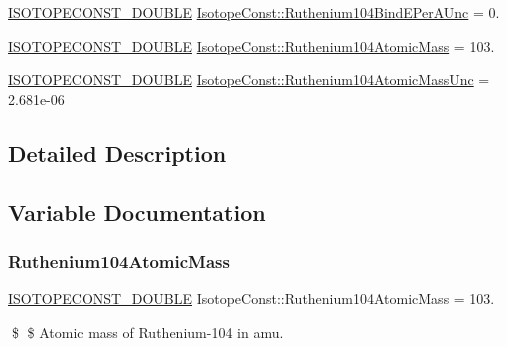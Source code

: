 \begin{DoxyCompactItemize}
\mbox{\hyperlink{group___isotope_const-_macros_ga8f45a7272ce02c0b4c65c44636ed719a}{I\+S\+O\+T\+O\+P\+E\+C\+O\+N\+S\+T\+\_\+\+D\+O\+U\+B\+LE}} \mbox{\hyperlink{group___isotope_const-_ruthenium-_ru104_ga43954b109e69058d0c82a1513cb40e38}{Isotope\+Const\+::\+Ruthenium104\+Bind\+E\+Per\+A\+Unc}} = 0.
\item 
\mbox{\hyperlink{group___isotope_const-_macros_ga8f45a7272ce02c0b4c65c44636ed719a}{I\+S\+O\+T\+O\+P\+E\+C\+O\+N\+S\+T\+\_\+\+D\+O\+U\+B\+LE}} \mbox{\hyperlink{group___isotope_const-_ruthenium-_ru104_ga0a195760467192883ad00c6e3ee94f8d}{Isotope\+Const\+::\+Ruthenium104\+Atomic\+Mass}} = 103.
\item 
\mbox{\hyperlink{group___isotope_const-_macros_ga8f45a7272ce02c0b4c65c44636ed719a}{I\+S\+O\+T\+O\+P\+E\+C\+O\+N\+S\+T\+\_\+\+D\+O\+U\+B\+LE}} \mbox{\hyperlink{group___isotope_const-_ruthenium-_ru104_ga26c836e5eb6c9ea11894e73d64dc2125}{Isotope\+Const\+::\+Ruthenium104\+Atomic\+Mass\+Unc}} = 2.\+681e-\/06
\end{DoxyCompactItemize}


\subsection{Detailed Description}


\subsection{Variable Documentation}
\mbox{\label{group___isotope_const-_ruthenium-_ru104_ga0a195760467192883ad00c6e3ee94f8d}} 
\subsubsection{\texorpdfstring{Ruthenium104\+Atomic\+Mass}{Ruthenium104AtomicMass}}
{\footnotesize\ttfamily \mbox{\hyperlink{group___isotope_const-_macros_ga8f45a7272ce02c0b4c65c44636ed719a}{I\+S\+O\+T\+O\+P\+E\+C\+O\+N\+S\+T\+\_\+\+D\+O\+U\+B\+LE}} Isotope\+Const\+::\+Ruthenium104\+Atomic\+Mass = 103.}

\$ \$ Atomic mass of Ruthenium-\/104 in amu. \mbox{\label{group___isotope_const-_ruthenium-_ru104_ga26c836e5eb6c9ea11894e73d64dc2125}} 
